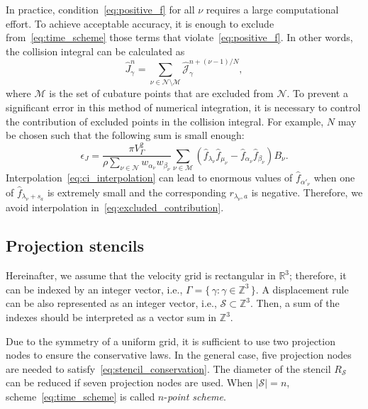 \documentclass[review]{elsarticle}
\newcommand{\Nu}{\mathcal{N}}
\newcommand{\Mu}{\mathcal{M}}
\newcommand{\Set}[2]{\{\,{#1}:{#2}\,\}}
\begin{document}
In practice, condition~\eqref{eq:positive_f} for all \(\nu\) requires a large computational effort.
To achieve acceptable accuracy, it is enough to exclude from~\eqref{eq:time_scheme} those terms
that violate~\eqref{eq:positive_f}. In other words, the collision integral can be calculated as
\begin{equation}\label{eq:discrete_short_ci_discarded}
    \hat{J}_\gamma^n = \sum_{\nu\in\Nu\setminus\Mu} \hat{\mathscr{J}}_\gamma^{n+(\nu-1)/N},
\end{equation}
where \(\Mu\) is the set of cubature points that are excluded from \(\Nu\).
To prevent a significant error in this method of numerical integration,
it is necessary to control the contribution of excluded points in the collision integral.
For example, \(N\) may be chosen such that the following sum is small enough:
\begin{equation}\label{eq:excluded_contribution}
    \epsilon_J = \frac{\pi V_\Gamma^2}{\rho\sum_{\nu\in\Nu} w_{\alpha_\nu}w_{\beta_\nu}}
        \sum_{\nu\in\Mu} \left(
            \hat{f}_{\lambda_\nu}\hat{f}_{\mu_\nu} - \hat{f}_{\alpha_\nu}\hat{f}_{\beta_\nu}
        \right)B_\nu.
\end{equation}
Interpolation~\eqref{eq:ci_interpolation} can lead to enormous values of \(\hat{f}_{\alpha'_\nu}\)
when one of \(\hat{f}_{\lambda_\nu+s_a}\) is extremely small and the corresponding \(r_{\lambda_\nu,a}\) is negative.
Therefore, we avoid interpolation in~\eqref{eq:excluded_contribution}.

\subsection{Projection stencils}

Hereinafter, we assume that the velocity grid is rectangular in \(\mathbb{R}^3\);
therefore, it can be indexed by an integer vector, i.e., \(\Gamma = \Set{\gamma}{\gamma\in\mathbb{Z}^3}\).
A displacement rule can be also represented as an integer vector, i.e., \(\mathcal{S}\subset\mathbb{Z}^3\).
Then, a sum of the indexes should be interpreted as a vector sum in \(\mathbb{Z}^3\).

Due to the symmetry of a uniform grid,
it is sufficient to use two projection nodes to ensure the conservative laws.
In the general case, five projection nodes are needed to satisfy~\eqref{eq:stencil_conservation}.
The diameter of the stencil \(R_\mathcal{S}\) can be reduced if seven projection nodes are used.
When \(|\mathcal{S}|=n\), scheme~\eqref{eq:time_scheme} is called \(n\)-\emph{point scheme}.
\end{document}

